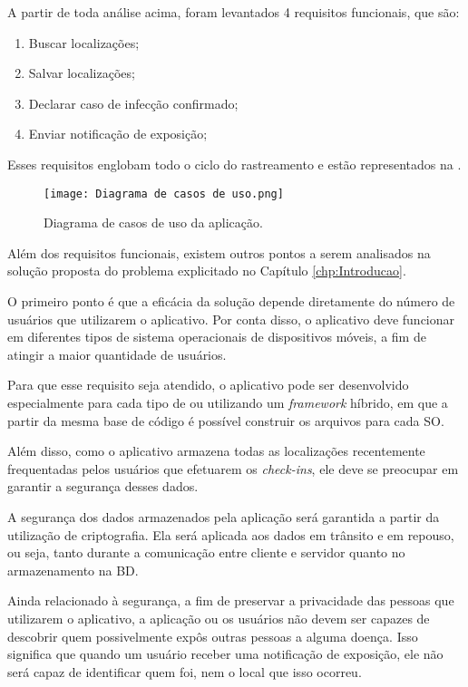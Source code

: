 A partir de toda análise acima, foram levantados 4 requisitos funcionais, que são:

\begin{enumerate}
  \item Buscar localizações;
  \item Salvar localizações;
  \item Declarar caso de infecção confirmado;
  \item Enviar notificação de exposição;
\end{enumerate}

Esses requisitos englobam todo o ciclo do rastreamento e estão representados na .

\begin{figure}[!htb]
\centering
\texttt{[image: Diagrama de casos de uso.png]}
\caption{Diagrama de casos de uso da aplicação.}
\label{fig:casosdeuso}
\end{figure}

Além dos requisitos funcionais, existem outros pontos a serem analisados na solução proposta do problema explicitado no Capítulo \ref{chp:Introducao}.

O primeiro ponto é que a eficácia da solução depende diretamente do número de usuários que utilizarem o aplicativo. Por conta disso, o aplicativo deve funcionar em diferentes tipos de sistema operacionais de dispositivos móveis, a fim de atingir a maior quantidade de usuários.

Para que esse requisito seja atendido, o aplicativo pode ser desenvolvido especialmente para cada tipo de  ou utilizando um \textit{framework} híbrido, em que a partir da mesma base de código é possível construir os arquivos para cada SO.

Além disso, como o aplicativo armazena todas as localizações recentemente frequentadas pelos usuários que efetuarem os \textit{check-ins}, ele deve se preocupar em garantir a segurança desses dados.

A segurança dos dados armazenados pela aplicação será garantida a partir da utilização de criptografia. Ela será aplicada aos dados em trânsito e em repouso, ou seja, tanto durante a comunicação entre cliente e servidor quanto no armazenamento na BD.

Ainda relacionado à segurança, a fim de preservar a privacidade das pessoas que utilizarem o aplicativo, a aplicação ou os usuários não devem ser capazes de descobrir quem possivelmente expôs outras pessoas a alguma doença. Isso significa que quando um usuário receber uma notificação de exposição, ele não será capaz de identificar quem foi, nem o local que isso ocorreu.

